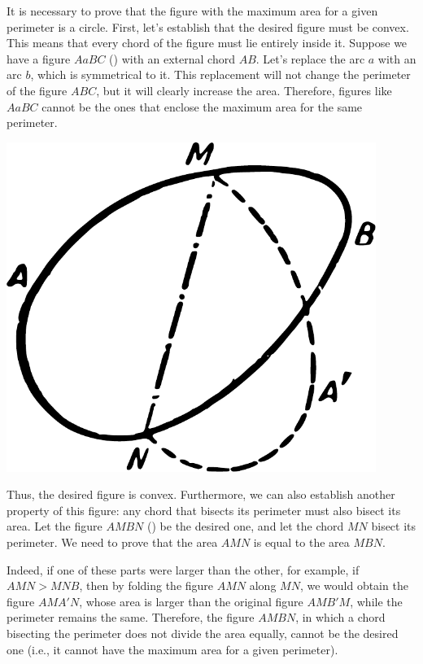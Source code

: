 It is necessary to prove that the figure with the maximum area for a given perimeter is a circle. First, let's establish that the desired figure must be convex. This means that every chord of the figure must lie entirely inside it. Suppose we have a figure \(AaBC\) () with an external chord \(AB\). Let's replace the arc \(a \) with an arc \(b \), which is symmetrical to it. This replacement will not change the perimeter of the figure \(ABC\), but it will clearly increase the area. Therefore, figures like \(AaBC\) cannot be the ones that enclose the maximum area for the same perimeter.

\begin{marginfigure}[-2cm]%
\centering
\includegraphics[width=0.9\textwidth]{figures/ch-12/fig-178.pdf}
\end{marginfigure}

Thus, the desired figure is convex. Furthermore, we can also establish another property of this figure: any chord that bisects its perimeter must also bisect its area. Let the figure \(AMBN\) () be the desired one, and let the chord \(MN\) bisect its perimeter. We need to prove that the area \(AMN\) is equal to the area \(MBN\). 



Indeed, if one of these parts were larger than the other, for example, if \(AMN > MNB\), then by folding the figure \(AMN\) along \(MN\), we would obtain the figure \(AMA'N\), whose area is larger than the original figure \(AMB'M\), while the perimeter remains the same. Therefore, the figure \(AMBN\), in which a chord bisecting the perimeter does not divide the area equally, cannot be the desired one (i.e., it cannot have the maximum area for a given perimeter).

